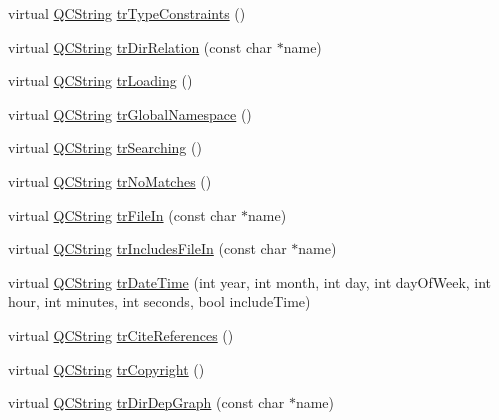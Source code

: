 \begin{DoxyCompactItemize}
\item 
virtual \mbox{\hyperlink{class_q_c_string}{Q\+C\+String}} \mbox{\hyperlink{class_translator_slovak_a9ba605e00a6306f18fd453d0607735de}{tr\+Type\+Constraints}} ()
\item 
virtual \mbox{\hyperlink{class_q_c_string}{Q\+C\+String}} \mbox{\hyperlink{class_translator_slovak_a9d17d02a70e8472d18c30ed973c7fee5}{tr\+Dir\+Relation}} (const char $\ast$name)
\item 
virtual \mbox{\hyperlink{class_q_c_string}{Q\+C\+String}} \mbox{\hyperlink{class_translator_slovak_a372bcec5d19f7d766be0d41aa7ab85ba}{tr\+Loading}} ()
\item 
virtual \mbox{\hyperlink{class_q_c_string}{Q\+C\+String}} \mbox{\hyperlink{class_translator_slovak_af8d1573ee123062ff485c58bfe45a482}{tr\+Global\+Namespace}} ()
\item 
virtual \mbox{\hyperlink{class_q_c_string}{Q\+C\+String}} \mbox{\hyperlink{class_translator_slovak_a1913e5c3ceb2d0b542d68420182f95b0}{tr\+Searching}} ()
\item 
virtual \mbox{\hyperlink{class_q_c_string}{Q\+C\+String}} \mbox{\hyperlink{class_translator_slovak_a6f16b4517d6d9acb26da28582bc5a2eb}{tr\+No\+Matches}} ()
\item 
virtual \mbox{\hyperlink{class_q_c_string}{Q\+C\+String}} \mbox{\hyperlink{class_translator_slovak_aa62747de6f954359908a97e608b64fa6}{tr\+File\+In}} (const char $\ast$name)
\item 
virtual \mbox{\hyperlink{class_q_c_string}{Q\+C\+String}} \mbox{\hyperlink{class_translator_slovak_a67cc741796096072099779e710727270}{tr\+Includes\+File\+In}} (const char $\ast$name)
\item 
virtual \mbox{\hyperlink{class_q_c_string}{Q\+C\+String}} \mbox{\hyperlink{class_translator_slovak_aedc4c9f5640d217e9b8da2282ec99434}{tr\+Date\+Time}} (int year, int month, int day, int day\+Of\+Week, int hour, int minutes, int seconds, bool include\+Time)
\item 
virtual \mbox{\hyperlink{class_q_c_string}{Q\+C\+String}} \mbox{\hyperlink{class_translator_slovak_ab6539bf4a7bdce6113ed9b15a9074aba}{tr\+Cite\+References}} ()
\item 
virtual \mbox{\hyperlink{class_q_c_string}{Q\+C\+String}} \mbox{\hyperlink{class_translator_slovak_a0768be46a7597885e722b8fc278e5cb0}{tr\+Copyright}} ()
\item 
virtual \mbox{\hyperlink{class_q_c_string}{Q\+C\+String}} \mbox{\hyperlink{class_translator_slovak_a40c11ac2f3d33292b043adf1ef4e6d66}{tr\+Dir\+Dep\+Graph}} (const char $\ast$name)

\end{DoxyCompactItemize}
